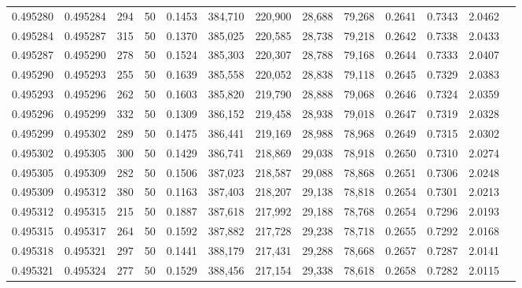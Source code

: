 \begin{tabular}{rrrrrrrrrrrrr}
0.495280 & 0.495284 &   294 &  50 &                                     0.1453 & 384,710 & 220,900 &  28,688 &  79,268 & 0.2641 & 0.7343 & 2.0462 \\
0.495284 & 0.495287 &   315 &  50 &                                     0.1370 & 385,025 & 220,585 &  28,738 &  79,218 & 0.2642 & 0.7338 & 2.0433 \\
0.495287 & 0.495290 &   278 &  50 &                                     0.1524 & 385,303 & 220,307 &  28,788 &  79,168 & 0.2644 & 0.7333 & 2.0407 \\
0.495290 & 0.495293 &   255 &  50 &                                     0.1639 & 385,558 & 220,052 &  28,838 &  79,118 & 0.2645 & 0.7329 & 2.0383 \\
0.495293 & 0.495296 &   262 &  50 &                                     0.1603 & 385,820 & 219,790 &  28,888 &  79,068 & 0.2646 & 0.7324 & 2.0359 \\
0.495296 & 0.495299 &   332 &  50 &                                     0.1309 & 386,152 & 219,458 &  28,938 &  79,018 & 0.2647 & 0.7319 & 2.0328 \\
0.495299 & 0.495302 &   289 &  50 &                                     0.1475 & 386,441 & 219,169 &  28,988 &  78,968 & 0.2649 & 0.7315 & 2.0302 \\
0.495302 & 0.495305 &   300 &  50 &                                     0.1429 & 386,741 & 218,869 &  29,038 &  78,918 & 0.2650 & 0.7310 & 2.0274 \\
0.495305 & 0.495309 &   282 &  50 &                                     0.1506 & 387,023 & 218,587 &  29,088 &  78,868 & 0.2651 & 0.7306 & 2.0248 \\
0.495309 & 0.495312 &   380 &  50 &                                     0.1163 & 387,403 & 218,207 &  29,138 &  78,818 & 0.2654 & 0.7301 & 2.0213 \\
0.495312 & 0.495315 &   215 &  50 &                                     0.1887 & 387,618 & 217,992 &  29,188 &  78,768 & 0.2654 & 0.7296 & 2.0193 \\
0.495315 & 0.495317 &   264 &  50 &                                     0.1592 & 387,882 & 217,728 &  29,238 &  78,718 & 0.2655 & 0.7292 & 2.0168 \\
0.495318 & 0.495321 &   297 &  50 &                                     0.1441 & 388,179 & 217,431 &  29,288 &  78,668 & 0.2657 & 0.7287 & 2.0141 \\
0.495321 & 0.495324 &   277 &  50 &                                     0.1529 & 388,456 & 217,154 &  29,338 &  78,618 & 0.2658 & 0.7282 & 2.0115 \\

\end{tabular}
